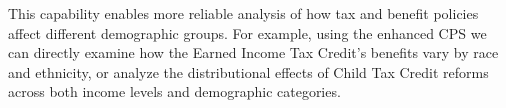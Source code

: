 This capability enables more reliable analysis of how tax and benefit policies affect different demographic groups. For example, using the enhanced CPS we can directly examine how the Earned Income Tax Credit's benefits vary by race and ethnicity, or analyze the distributional effects of Child Tax Credit reforms across both income levels and demographic categories.